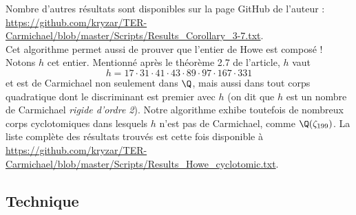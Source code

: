 Nombre d'autres résultats sont disponibles sur la page GitHub de l'auteur : \url{https://github.com/kryzar/TER-Carmichael/blob/master/Scripts/Results_Corollary_3-7.txt}. \\

Cet algorithme permet aussi de prouver que l'entier de Howe est composé ! Notons $h$ cet entier. Mentionné après le théorème 2.7 de l'article, $h$ vaut $$h = 17 \cdot 31 \cdot 41 \cdot 43 \cdot 89 \cdot 97 \cdot 167 \cdot 331$$ et est de Carmichael non seulement dans $\Q$, mais aussi dans tout corps quadratique dont le discriminant est premier avec $h$ (on dit que $h$ est un nombre de Carmichael \emph{rigide d'ordre 2}). Notre algorithme exhibe toutefois de nombreux corps cyclotomiques dans lesquels $h$ n'est pas de Carmichael, comme $\Q(\zeta_{199})$. La liste complète des résultats trouvés est cette fois disponible à \url{https://github.com/kryzar/TER-Carmichael/blob/master/Scripts/Results_Howe_cyclotomic.txt}.


\subsection{Technique}
